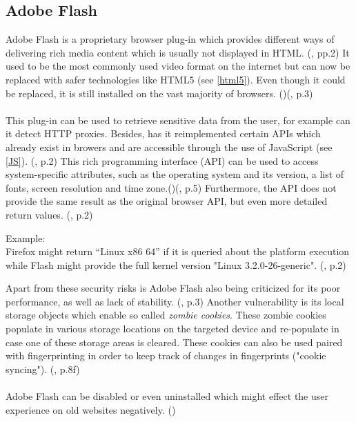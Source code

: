 \subsection{Adobe Flash}\label{adobe}
Adobe Flash is a proprietary browser plug-in which provides different ways of delivering rich media content which is usually not displayed in HTML. (\textcite{nikiforakis13}, pp.2) It used to be the most commonly used video format on the internet but can now be replaced with safer technologies like HTML5 (see \autoref{html5}). Even though it could be replaced, it is still installed on the vast majority of browsers. (\textcite{web17})(\textcite{nikiforakis13}, p.3) \\\\
This plug-in can be used to retrieve sensitive data from the user, for example can it detect HTTP proxies. Besides, has it reimplemented certain APIs which already exist in browers and are accessible through the use of JavaScript (see \autoref{JS}). (\textcite{nikiforakis13}, p.2) This rich programming interface (API) can be used to access system-specific attributes, such as the operating system and its version, a list of fonts, screen resolution and time zone.(\textcite{amiunique})(\textcite{havens16}, p.5) Furthermore, the API does not provide the same result as the original browser API, but even more detailed return values. (\textcite{nikiforakis13}, p.2)
\begin{tcolorbox}
	Example: \\
	Firefox might return “Linux x86 64” if it is queried about the platform execution while Flash might provide the full kernel version "Linux 3.2.0-26-generic". (\textcite{nikiforakis13}, p.2)\\
\end{tcolorbox}
Apart from these security risks is Adobe Flash also being criticized for its poor performance, as well as lack of stability. (\textcite{nikiforakis13}, p.3) Another vulnerability is its local storage objects which enable so called \textit{zombie cookies}. These zombie cookies populate in various storage locations on the targeted device and re-populate in case one of these storage areas is cleared. These cookies can also be used paired with fingerprinting in order to keep track of changes in fingerprints ("cookie syncing"). (\textcite{havens16}, p.8f)\\\\
Adobe Flash can be disabled or even uninstalled which might effect the user experience on old websites negatively. (\textcite{pixel18})

